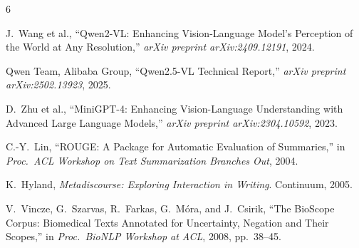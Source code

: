 \documentclass[10pt, twocolumn]{article}
\begin{document}
\begin{thebibliography}{6}

J.~Wang et al.,
``Qwen2-VL: Enhancing Vision-Language Model's Perception of the World at Any
  Resolution,''
\textit{arXiv preprint arXiv:2409.12191}, 2024.

Qwen Team, Alibaba Group,
``Qwen2.5-VL Technical Report,''
\textit{arXiv preprint arXiv:2502.13923}, 2025.


D.~Zhu et al.,
``MiniGPT-4: Enhancing Vision-Language Understanding with Advanced Large
  Language Models,''
\textit{arXiv preprint arXiv:2304.10592}, 2023.

C.-Y.~Lin,
``ROUGE: A Package for Automatic Evaluation of Summaries,''
in \textit{Proc.\ ACL Workshop on Text Summarization Branches Out}, 2004.

K.~Hyland,
\textit{Metadiscourse: Exploring Interaction in Writing}.
Continuum, 2005.

V.~Vincze, G.~Szarvas, R.~Farkas, G.~M\'{o}ra, and J.~Csirik,
``The BioScope Corpus: Biomedical Texts Annotated for Uncertainty,
  Negation and Their Scopes,''
in \textit{Proc.\ BioNLP Workshop at ACL}, 2008, pp.~38--45.

\end{thebibliography}
\end{document}
